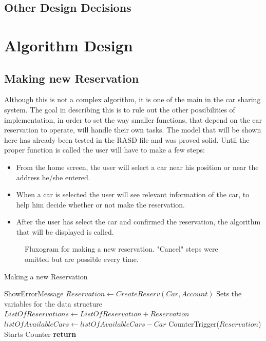 \documentclass[a4paper]{article}
\begin{document}
\subsection{Other Design Decisions}

\newpage
\section{Algorithm Design}
\subsection{Making new Reservation}

Although this is not a complex algorithm, it is one of the main in the car sharing system. The goal in describing this is to rule out the other possibilities of implementation, in order to set the way smaller functions, that depend on the car reservation to operate, will handle their own tasks. The model that will be shown here has already been tested in the RASD file and was proved solid. \newline
Until the proper function is called the user will have to make a few steps:
\begin{itemize} 
\item From the home screen, the user will select a car near his position or near the address he/she entered.
\item  When a car is selected the user will see relevant information of the car, to help him decide whether or not make the reservation.
\item After the user has select the car and confirmed the reservation, the algorithm that will be displayed is called.
\end{itemize}
\begin{figure}[h]
\centering
\vspace*{\fill}
\noindent{}%
\caption {Fluxogram for making a new reservation. "Cancel" steps were omitted but are possible every time.}
\vspace*{0.2cm}
\end{figure}

\begin{algorithm}
\caption{Making a new Reservation}\label{MakeReserv}
\begin{algorithmic}[1]

	\State ShowErrorMessage
\Else
\State $Reservation \leftarrow CreateReserv(Car, Account)$ \Comment Sets the variables for the data structure
\State $ListOfReservations \leftarrow ListOfReservation + Reservation$
\State $listOfAvailableCars \leftarrow listOfAvailableCars - Car$
\State CounterTrigger($Reservation$) \Comment Starts Counter
\EndIf
\State \textbf{return} 
\EndProcedure
\end{algorithmic}
\end{algorithm}
\end{document}
